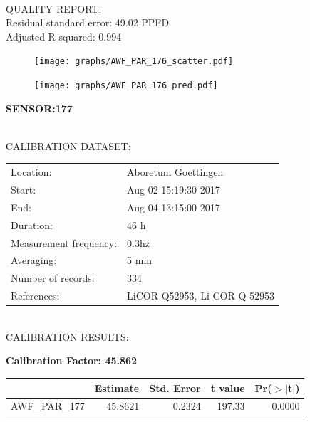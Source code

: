 \documentclass[oneside]{report}
\begin{document}
\hrulefill\\
QUALITY REPORT:\\
Residual standard error: 49.02 PPFD\\
Adjusted R-squared: 0.994



\begin{figure}[H]
  \centering
  \texttt{[image: graphs/AWF\_PAR\_176\_scatter.pdf]}
\end{figure}




\begin{figure}[H]
  \centering
  \texttt{[image: graphs/AWF\_PAR\_176\_pred.pdf]}
\end{figure}

\pagebreak


\begin{center}
\large{\textbf{SENSOR:177}}\\
\end{center}

\hrulefill\\
CALIBRATION DATASET:\\
\begin{table}[h!]
  \centering
  \label{tab:table1}
  \begin{tabular}{ll}
    Location: & Aboretum Goettingen\\ 
    
    
    Start:  & Aug 02 15:19:30 2017 \\
    End:   & Aug 04 13:15:00 2017\\ 
    Duration: & 46 h\\
    Measurement frequency: & 0.3hz\\
    Averaging:  &5 min\\
    Number of records: & 334 \\
    References: & LiCOR Q52953, Li-COR Q 52953 \\
  \end{tabular}
\end{table}

\hrulefill\\
CALIBRATION RESULTS:\\


\begin{center}
\textbf{\large{Calibration Factor: 45.862}}\\
\end{center}
\begin{table}[ht]
\centering
\begin{tabular}{rrrrr}
  \hline
 & Estimate & Std. Error & t value & Pr($>$$|$t$|$) \\ 
  \hline
AWF\_PAR\_177 & 45.8621 & 0.2324 & 197.33 & 0.0000 \\ 
   \hline
\end{tabular}
\end{table}
\end{document}
